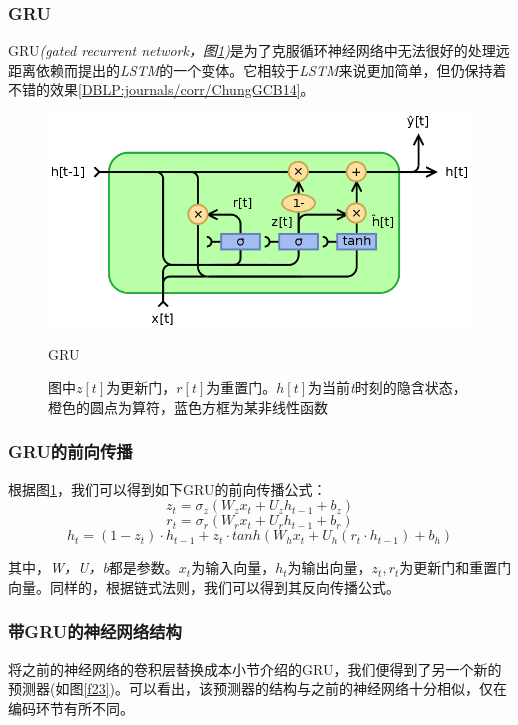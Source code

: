 \documentclass[12pt]{template}
\begin{document}
\subsubsection{GRU}
GRU\textit{(gated recurrent network，图\ref{f22})}是为了克服循环神经网络中无法很好的处理远距离依赖而提出的\textit{LSTM}的一个变体。它相较于\textit{LSTM}来说更加简单，但仍保持着不错的效果\ref{DBLP:journals/corr/ChungGCB14}。

\begin{figure}[htbp]
    \centering
    \includegraphics[width=13.5cm]{GRU.png}
    \caption{GRU}
    \captionsetup{font=footnotesize,margin=30pt}\caption*{图中\(z[t]\)为更新门，\(r[t]\)为重置门。\(h[t]\)为当前\textit{t}时刻的隐含状态，橙色的圆点为算符，蓝色方框为某非线性函数}
    \label{f22}
\end{figure}

\subsubsection{GRU的前向传播}
根据图\ref{f22}，我们可以得到如下GRU的前向传播公式：
\begin{equation}
z_t=\sigma_z(W_zx_t+U_zh_{t-1}+b_z) 
\end{equation}
\begin{equation}
r_t=\sigma_r(W_rx_t+U_rh_{t-1}+b_r) 
\end{equation}
\begin{equation}
h_t=(1-z_t)\cdot h_{t-1}+z_t\cdot tanh(W_hx_t+U_h(r_t\cdot h_{t-1})+b_h)
\end{equation}

其中，\textit{W，U，b}都是参数。\(x_t\)为输入向量，\(h_t\)为输出向量，\(z_t,r_t\)为更新门和重置门向量。同样的，根据链式法则，我们可以得到其反向传播公式。
\subsubsection{带GRU的神经网络结构}
将之前的神经网络的卷积层替换成本小节介绍的GRU，我们便得到了另一个新的预测器(如图\ref{f23})。可以看出，该预测器的结构与之前的神经网络十分相似，仅在编码环节有所不同。
\end{document}
